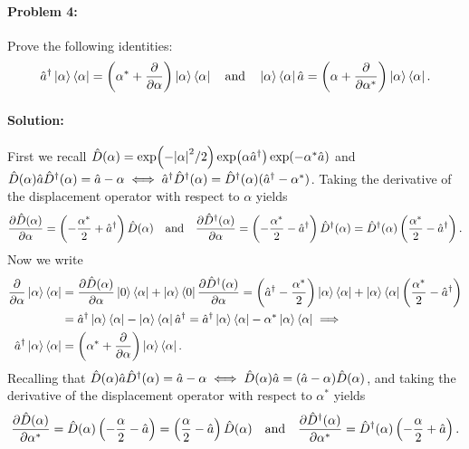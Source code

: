 \paragraph{Problem 4:} Prove the following identities:
\begin{equation}
    \hat{a}^\dagger \ket{\alpha}\bra{\alpha} = \left(\alpha^* + \frac{\partial}{\partial \alpha}\right) \ket{\alpha}\bra{\alpha} \quad\text{and}\quad \ket{\alpha}\bra{\alpha} \hat{a} = \left(\alpha + \frac{\partial}{\partial \alpha^*}\right) \ket{\alpha}\bra{\alpha}.
\end{equation}
\paragraph{Solution:} First we recall $\hat{D}(\alpha) = \exp(-\abs{\alpha}^2 /2) \exp(\alpha \hat{a}^\dagger) \exp(-\alpha^*\hat{a})$ and $\hat{D}(\alpha) \hat{a} \hat{D}^\dagger(\alpha) = \hat{a} - \alpha \iff \hat{a}^\dagger \hat{D}^\dagger(\alpha) = \hat{D}^\dagger(\alpha)(\hat{a}^\dagger - \alpha^*)$. Taking the derivative of the displacement operator with respect to $\alpha$ yields
\begin{equation}
    \frac{\partial \hat{D}(\alpha)}{\partial \alpha} = \left( - \frac{\alpha^*}{2} + \hat{a}^\dagger \right)\hat{D}(\alpha) \quad\text{and}\quad \frac{\partial \hat{D}^\dagger(\alpha)}{\partial \alpha} = \left( -\frac{\alpha^*}{2} -\hat{a}^\dagger \right) \hat{D}^\dagger(\alpha) = \hat{D}^\dagger(\alpha) \left(  \frac{\alpha^*}{2} - \hat{a}^\dagger\right).
\end{equation}
Now we write
\begin{align}
    \frac{\partial}{\partial \alpha} \ket{\alpha}\bra{\alpha} &= \frac{\partial\hat{D}(\alpha)}{\partial\alpha} \ket{0}\bra{\alpha} + \ket{\alpha} \bra{0}  \frac{\partial \hat{D}^\dagger(\alpha)}{\partial \alpha}  = \left(\hat{a}^\dagger - \frac{\alpha^*}{2}\right)\ket{\alpha}\bra{\alpha} + \ket{\alpha}\bra{\alpha} \left(\frac{\alpha^*}{2} - \hat{a}^\dagger\right)\\
    &= \hat{a}^\dagger \ket{\alpha}\bra{\alpha} - \ket{\alpha}\bra{\alpha} \hat{a}^\dagger = \hat{a}^\dagger \ket{\alpha}\bra{\alpha} - \alpha^* \ket{\alpha}\bra{\alpha} \implies \\
    \hat{a}^\dagger \ket{\alpha}\bra{\alpha} &= \left(\alpha^* + \frac{\partial}{\partial \alpha}\right) \ket{\alpha}\bra{\alpha}.
\end{align}
Recalling that $\hat{D}(\alpha) \hat{a} \hat{D}^\dagger(\alpha) = \hat{a} - \alpha \iff \hat{D}(\alpha) \hat{a} = (\hat{a} - \alpha)\hat{D}(\alpha)$, and taking the derivative of the displacement operator with respect to $\alpha^*$ yields
\begin{equation}
    \frac{\partial \hat{D}(\alpha)}{\partial \alpha^*} = \hat{D}(\alpha) \left( -\frac{\alpha}{2} - \hat{a}\right) = \left(\frac{\alpha}{2} - \hat{a}\right)\hat{D}(\alpha) \quad\text{and}\quad \frac{\partial \hat{D}^\dagger(\alpha)}{\partial\alpha^*} = \hat{D}^\dagger(\alpha) \left(-\frac{\alpha}{2} + \hat{a}\right).
\end{equation}
